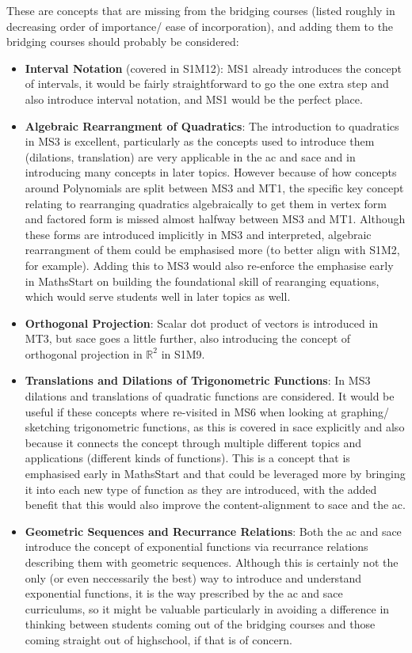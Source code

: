 \documentclass[twoside,12pt,a4paper]{report}
\begin{document}
These are concepts that are missing from the bridging courses (listed roughly in decreasing order of importance/ ease of incorporation), and adding them to the bridging courses should probably be considered:
\begin{itemize}
	\item \textbf{Interval Notation} (covered in S1M12): MS1 already introduces the concept of intervals, it would be fairly straightforward to go the one extra step and also introduce interval notation, and MS1 would be the perfect place.
	\item \textbf{Algebraic Rearrangment of Quadratics}:  The introduction to quadratics in MS3 is excellent, particularly as the concepts used to introduce them (dilations, translation) are very applicable in the \gls{ac} and \gls{sace} and in introducing many concepts in later topics. However because of how concepts around Polynomials are split between MS3 and MT1, the specific key concept relating to rearranging quadratics algebraically to get them in vertex form and factored form is missed almost halfway between MS3 and MT1. Although these forms are introduced implicitly in MS3 and interpreted, algebraic rearrangment of them could be emphasised more (to better align with S1M2, for example). Adding this to MS3 would also re-enforce the emphasise early in MathsStart on building the foundational skill of rearanging equations, which would serve students well in later topics as well. 
	\item \textbf{Orthogonal Projection}: Scalar dot product of vectors is introduced in MT3, but \gls{sace} goes a little further, also introducing the concept of orthogonal projection in $\mathbb{R}^2$ in S1M9.
	\item \textbf{Translations and Dilations of Trigonometric Functions}: In MS3 dilations and translations of quadratic functions are considered. It would be useful if these concepts where re-visited in MS6 when looking at graphing/ sketching trigonometric functions, as this is covered in \gls{sace} explicitly and also because it connects the concept through multiple different topics and applications (different kinds of functions). This is a concept that is emphasised early in MathsStart and that could be leveraged more by bringing it into each new type of function as they are introduced, with the added benefit that this would also improve the content-alignment to \gls{sace} and the \gls{ac}.
	\item \textbf{Geometric Sequences and Recurrance Relations}: Both the \gls{ac} and \gls{sace} introduce the concept of exponential functions via recurrance relations describing them with geometric sequences. Although this is certainly not the only (or even neccessarily the best) way to introduce and understand exponential functions, it is the way prescribed by the \gls{ac} and \gls{sace} curriculums, so it might be valuable particularly in avoiding a difference in thinking between students coming out of the bridging courses and those coming straight out of highschool, if that is of concern. 
\end{itemize}
\end{document}
